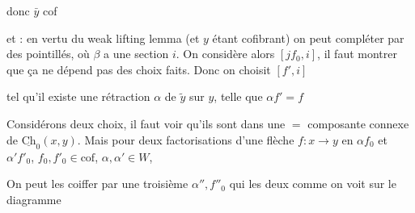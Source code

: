 donc $\bar y$ cof

et : en vertu du weak lifting lemma (et $y$ étant cofibrant) on peut compléter par des pointillés, où $\beta$ a une section $i$. On considère alors $[jf_0,i]$, il faut montrer que ça ne dépend pas des choix faits. Donc on choisit $[f',i]$



tel qu'il existe  une rétraction $\alpha$ de $\widetilde y$ sur $y$, telle que $\alpha f'=f$

Considérons deux  choix, il faut voir qu'ils sont dans une $=$ composante connexe de $\underline{\mathrm{Ch}}_0(x,y)$. Mais pour deux factorisations d'une flèche $f:x\longrightarrow y$ en $\alpha f_0$ et $\alpha'f'_0$, $f_0,f'_0\in\mathrm{cof}$, $\alpha,\alpha'\in W$,


On peut les coiffer par une troisième  $\alpha'',f''_0$ qui   les deux comme on voit sur le diagramme


